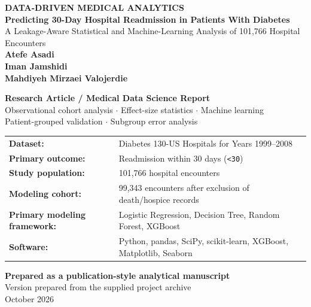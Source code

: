 \documentclass[10pt,a4paper]{article}
\begin{document}
\begin{titlepage}
\centering
\vspace*{1.0cm}
{\Large\bfseries\color{medicalblue} DATA-DRIVEN MEDICAL ANALYTICS}\\[0.7cm]
{\Huge\bfseries Predicting 30-Day Hospital Readmission in Patients With Diabetes}\\[0.45cm]
{\Large A Leakage-Aware Statistical and Machine-Learning Analysis of 101,766 Hospital Encounters}\\[0.9cm]
{\large\bfseries Atefe Asadi}\\[0.12cm]
{\large\bfseries Iman Jamshidi}\\[0.12cm]
{\large\bfseries Mahdiyeh Mirzaei Valojerdie}\\[1.0cm]

\begin{tcolorbox}[colback=medicallight,colframe=medicalblue,width=0.92\textwidth,arc=2mm,boxrule=0.8pt]
\centering
\textbf{Research Article / Medical Data Science Report}\\[0.25cm]
Observational cohort analysis \quad $\cdot$ \quad Effect-size statistics \quad $\cdot$ \quad Machine learning\\
Patient-grouped validation \quad $\cdot$ \quad Subgroup error analysis
\end{tcolorbox}

\vfill
\small
\begin{tabular}{@{}lp{9.6cm}@{}}
\textbf{Dataset:} & Diabetes 130-US Hospitals for Years 1999--2008\\
\textbf{Primary outcome:} & Readmission within 30 days (\texttt{<30})\\
\textbf{Study population:} & 101,766 hospital encounters\\
\textbf{Modeling cohort:} & 99,343 encounters after exclusion of death/hospice records\\
\textbf{Primary modeling framework:} & Logistic Regression, Decision Tree, Random Forest, XGBoost\\
\textbf{Software:} & Python, pandas, SciPy, scikit-learn, XGBoost, Matplotlib, Seaborn\\
\end{tabular}

\vfill
{\large\textbf{Prepared as a publication-style analytical manuscript}}\\
\vspace{0.3cm}
{\small Version prepared from the supplied project archive}\\
{\small October 2026}
\end{titlepage}
\end{document}

